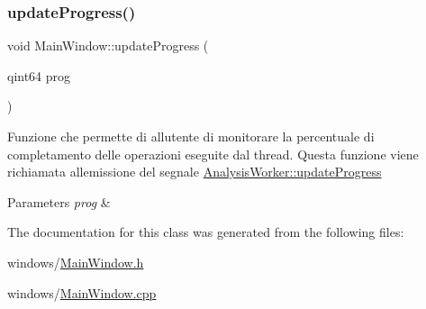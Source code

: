 \subsubsection{\texorpdfstring{update\+Progress()}{updateProgress()}}
{\footnotesize\ttfamily void Main\+Window\+::update\+Progress (\begin{DoxyParamCaption}\item[{qint64}]{prog }\end{DoxyParamCaption})}

Funzione che permette di all\textquotesingle{}utente di monitorare la percentuale di completamento delle operazioni eseguite dal thread. Questa funzione viene richiamata all\textquotesingle{}emissione del segnale {\ttfamily \hyperlink{class_analysis_worker_a4a7f46d081dfd2872a498f1183581ea9}{Analysis\+Worker\+::update\+Progress}} 
\begin{DoxyParams}{Parameters}
{\em prog} & \\
\hline
\end{DoxyParams}


The documentation for this class was generated from the following files\+:\begin{DoxyCompactItemize}
\item 
windows/\hyperlink{_main_window_8h}{Main\+Window.\+h}\item 
windows/\hyperlink{_main_window_8cpp}{Main\+Window.\+cpp}\end{DoxyCompactItemize}
